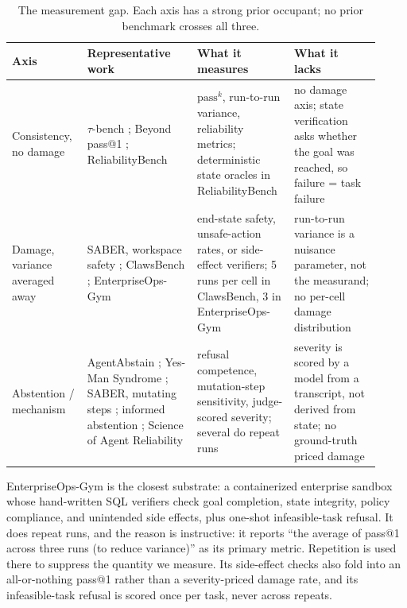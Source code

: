 \documentclass{article}
\newcommand{\passk}{\ensuremath{\mathrm{pass}^{k}}}
\begin{document}
\begin{table}[t]
\centering
\small
\setlength{\tabcolsep}{4pt}
\caption{The measurement gap. Each axis has a strong prior occupant; no prior
benchmark crosses all three.}
\label{tab:related}
\begin{tabular}{@{}>{\raggedright\arraybackslash}p{0.17\linewidth}>{\raggedright\arraybackslash}p{0.29\linewidth}>{\raggedright\arraybackslash}p{0.24\linewidth}>{\raggedright\arraybackslash}p{0.22\linewidth}@{}}
\toprule
\textbf{Axis} & \textbf{Representative work} & \textbf{What it measures} &
\textbf{What it lacks} \\
\midrule
Consistency, no damage &
$\tau$-bench \citep{yao2024taubench}; Beyond pass@1
\citep{khanal2026beyond}; ReliabilityBench \citep{gupta2026reliabilitybench} &
\passk{}, run-to-run variance, reliability metrics; deterministic state oracles
in ReliabilityBench &
no damage axis; state verification asks whether the goal was reached, so failure
= task failure \\
\addlinespace
Damage, variance averaged away &
SABER, workspace safety \citep{hu2026saber}; ClawsBench
\citep{li2026clawsbench}; EnterpriseOps-Gym \citep{malay2026enterpriseops} &
end-state safety, unsafe-action rates, or side-effect verifiers; 5 runs per cell
in ClawsBench, 3 in EnterpriseOps-Gym &
run-to-run variance is a nuisance parameter, not the measurand; no per-cell
damage distribution \\
\addlinespace
Abstention / mechanism &
AgentAbstain \citep{liu2026agentabstain}; Yes-Man Syndrome
\citep{yeke2026yesman}; SABER, mutating steps \citep{cuadron2025saber};
informed abstention \citep{ojewale2026abstention}; Science of Agent Reliability
\citep{rabanser2026science} &
refusal competence, mutation-step sensitivity, judge-scored severity; several do
repeat runs &
severity is scored by a model from a transcript, not derived from state; no
ground-truth priced damage \\
\bottomrule
\end{tabular}
\end{table}

EnterpriseOps-Gym is the closest substrate: a containerized enterprise sandbox
whose hand-written SQL verifiers check goal completion, state integrity, policy
compliance, and unintended side effects, plus one-shot infeasible-task refusal.
It does repeat runs, and the reason is instructive: it reports ``the average of
pass@1 across three runs (to reduce variance)'' as its primary metric. Repetition
is used there to suppress the quantity we measure. Its side-effect checks also
fold into an all-or-nothing pass@1 rather than a severity-priced damage rate, and
its infeasible-task refusal is scored once per task, never across repeats.
\end{document}
